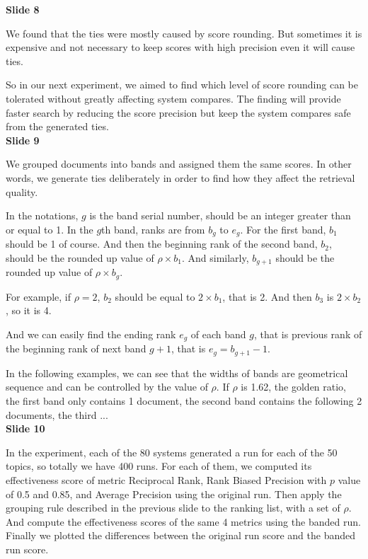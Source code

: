 \documentclass{article}
\begin{document}
\textbf{Slide 8}

We found that the ties were mostly caused by score rounding. But sometimes it is expensive and not necessary to keep scores with high precision even it will cause ties.

So in our next experiment, we aimed to find which level of score rounding can be tolerated without greatly affecting system compares. The finding will provide faster search by reducing the score precision but keep the system compares safe from the generated ties.\\[1em]

\textbf{Slide 9}

We grouped documents into bands and assigned them the same scores. In other words, we generate ties deliberately in order to find how they affect the retrieval quality.

In the notations, $g$ is the band serial number, should be an integer greater than or equal to 1. In the $g$th band, ranks are from $b_g$ to $e_g$. For the first band, $b_1$ should be 1 of course. And then the beginning rank of the second band, $b_2$, should be the rounded up value of $\rho \times b_1$. And similarly, $b_{g+1}$ should be the rounded up value of $\rho \times b_g$.

For example, if $\rho=2$, $b_2$ should be equal to $2 \times b_1$, that is 2. And then $b_3$ is $2 \times b_2$, so it is 4.

And we can easily find the ending rank $e_g$ of each band $g$, that is previous rank of the beginning rank of next band $g+1$, that is $e_g = b_{g+1}-1$.

In the following examples, we can see that the widths of bands are geometrical sequence and can be controlled by the value of $\rho$. If $\rho$ is 1.62, the golden ratio, the first band only contains 1 document, the second band contains the following 2 documents, the third ...\\[1em]

\textbf{Slide 10}

In the experiment, each of the 80 systems generated a run for each of the 50 topics, so totally we have 400 runs. For each of them, we computed its effectiveness score of metric Reciprocal Rank, Rank Biased Precision with $p$ value of 0.5 and 0.85, and Average Precision using the original run. Then apply the grouping rule described in the previous slide to the ranking list, with a set of $\rho$. And compute the effectiveness scores of the same 4 metrics using the banded run. Finally we plotted the differences between the original run score and the banded run score.\\[1em]
\end{document}
